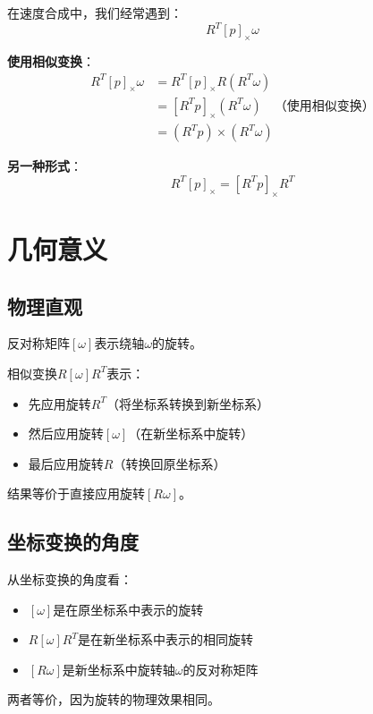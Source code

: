 \documentclass[12pt,a4paper]{article}
\begin{document}
在速度合成中，我们经常遇到：
\begin{equation}
R^T [p]_{\times} \omega
\end{equation}

\textbf{使用相似变换}：
\begin{align}
R^T [p]_{\times} \omega &= R^T [p]_{\times} R (R^T \omega) \\
&= [R^T p]_{\times} (R^T \omega) \quad \text{（使用相似变换）} \\
&= (R^T p) \times (R^T \omega)
\end{align}

\textbf{另一种形式}：
\begin{equation}
R^T [p]_{\times} = [R^T p]_{\times} R^T
\end{equation}

\section{几何意义}

\subsection{物理直观}

反对称矩阵$[\omega]$表示绕轴$\omega$的旋转。

相似变换$R [\omega] R^T$表示：
\begin{itemize}
\item 先应用旋转$R^T$（将坐标系转换到新坐标系）
\item 然后应用旋转$[\omega]$（在新坐标系中旋转）
\item 最后应用旋转$R$（转换回原坐标系）
\end{itemize}

结果等价于直接应用旋转$[R \omega]$。

\subsection{坐标变换的角度}

从坐标变换的角度看：
\begin{itemize}
\item $[\omega]$是在原坐标系中表示的旋转
\item $R [\omega] R^T$是在新坐标系中表示的相同旋转
\item $[R \omega]$是新坐标系中旋转轴$\omega$的反对称矩阵
\end{itemize}

两者等价，因为旋转的物理效果相同。
\end{document}
